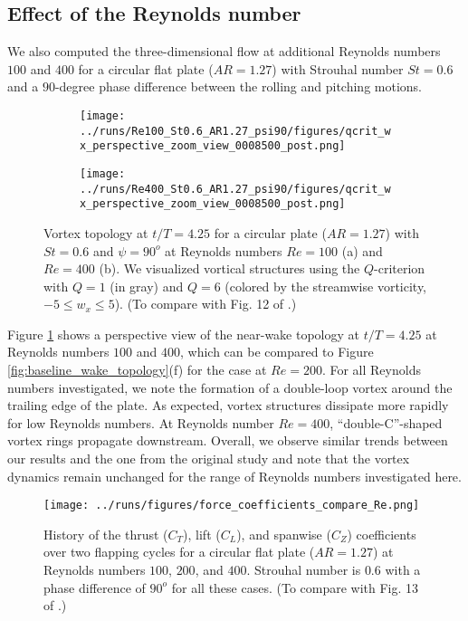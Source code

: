 \subsection{Effect of the Reynolds number}

We also computed the three-dimensional flow at additional Reynolds numbers $100$ and $400$ for a circular flat plate ($AR = 1.27$) with Strouhal number $St = 0.6$ and a $90$-degree phase difference between the rolling and pitching motions.

\begin{figure}
  \centering
  \begin{subfigure}[c]{0.45\textwidth}
    \centering
    \texttt{[image: ../runs/Re100\_St0.6\_AR1.27\_psi90/figures/qcrit\_wx\_perspective\_zoom\_view\_0008500\_post.png]}
    \caption{}
  \end{subfigure}
  \hfill
  \begin{subfigure}[c]{0.45\textwidth}
    \centering
    \texttt{[image: ../runs/Re400\_St0.6\_AR1.27\_psi90/figures/qcrit\_wx\_perspective\_zoom\_view\_0008500\_post.png]}
    \caption{}
  \end{subfigure}
  \caption{Vortex topology at $t / T = 4.25$ for a circular plate ($AR = 1.27$) with $St = 0.6$ and $\psi = 90^o$ at Reynolds numbers $Re = 100$ (a) and $Re = 400$ (b). We visualized vortical structures using the $Q$-criterion with $Q = 1$ (in gray) and $Q = 6$ (colored by the streamwise vorticity, $-5 \leq w_x \leq 5$). (To compare with Fig. 12 of \citet{li_dong_2016}.)}
  \label{fig:reynolds_wake_topology}
\end{figure}

Figure \ref{fig:reynolds_wake_topology} shows a perspective view of the near-wake topology at $t/T = 4.25$ at Reynolds numbers $100$ and $400$, which can be compared to Figure \ref{fig:baseline_wake_topology}(f) for the case at $Re = 200$.
For all Reynolds numbers investigated, we note the formation of a double-loop vortex around the trailing edge of the plate.
As expected, vortex structures dissipate more rapidly for low Reynolds numbers.
At Reynolds number $Re = 400$, ``double-C''-shaped vortex rings propagate downstream.
Overall, we observe similar trends between our results and the one from the original study and note that the vortex dynamics remain unchanged for the range of Reynolds numbers investigated here.

\begin{figure}
  \centering
  \texttt{[image: ../runs/figures/force\_coefficients\_compare\_Re.png]}
  \caption{History of the thrust ($C_T$), lift ($C_L$), and spanwise ($C_Z$) coefficients over two flapping cycles for a circular flat plate ($AR = 1.27$) at Reynolds numbers $100$, $200$, and $400$. Strouhal number is $0.6$ with a phase difference of $90^o$ for all these cases. (To compare with Fig. 13 of \citet{li_dong_2016}.)}
  \label{fig:reynolds_force_coefficients}
\end{figure}

